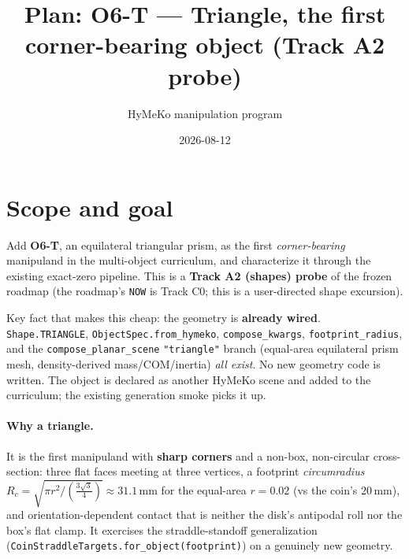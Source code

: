 \documentclass[11pt]{article}
\title{Plan: O6-T --- Triangle, the first corner-bearing object (Track A2 probe)}
\author{HyMeKo manipulation program}
\date{2026-08-12}
\begin{document}
\maketitle

\section{Scope and goal}
Add \textbf{O6-T}, an equilateral triangular prism, as the first \emph{corner-bearing}
manipuland in the multi-object curriculum, and characterize it through the existing
exact-zero pipeline. This is a \textbf{Track A2 (shapes) probe} of the frozen roadmap
(the roadmap's \texttt{NOW} is Track C0; this is a user-directed shape excursion).

Key fact that makes this cheap: the geometry is \textbf{already wired}. \texttt{Shape.TRIANGLE},
\texttt{ObjectSpec.from\_hymeko}, \texttt{compose\_kwargs}, \texttt{footprint\_radius}, and the
\texttt{compose\_planar\_scene} \texttt{"triangle"} branch (equal-area equilateral prism mesh,
density-derived mass/COM/inertia) \emph{all exist}. No new geometry code is written. The object
is declared as another HyMeKo scene and added to the curriculum; the existing generation smoke
picks it up.

\paragraph{Why a triangle.} It is the first manipuland with \textbf{sharp corners} and a
non-box, non-circular cross-section: three flat faces meeting at three vertices, a footprint
\emph{circumradius} $R_c=\sqrt{\pi r^2/(\tfrac{3\sqrt3}{4})}\approx 31.1$\,mm for the equal-area
$r=0.02$ (vs the coin's $20$\,mm), and orientation-dependent contact that is neither the disk's
antipodal roll nor the box's flat clamp. It exercises the straddle-standoff generalization
(\texttt{CoinStraddleTargets.for\_object(footprint)}) on a genuinely new geometry.
\end{document}
